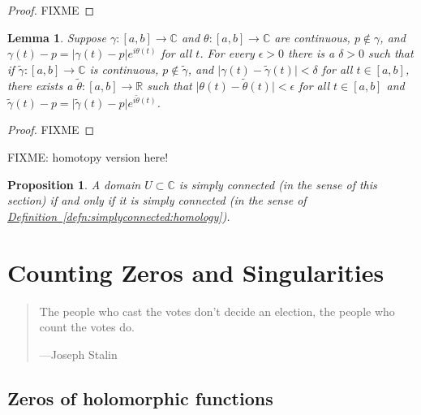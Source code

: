 \documentclass[12pt,openany]{book}
\newcommand{\sabs}[1]{\lvert {#1} \rvert}
\newcommand{\C}{{\mathbb{C}}}
\newcommand{\R}{{\mathbb{R}}}
\theoremstyle{plain}
\newtheorem{lemma}[thm]{Lemma}
\newtheorem{prop}[thm]{Proposition}
\theoremstyle{remark}
\theoremstyle{definition}
\newenvironment{myquote}{%
    \begin{quote}%
    \begingroup\itshape
}{%
    \endgroup%
    \end{quote}
}
\theoremstyle{exercise}
\theoremstyle{example}
\newcommand{\defnref}[1]{\hyperref[#1]{Definition~\ref*{#1}}}
\begin{document}
\begin{proof}
FIXME
\end{proof}

\begin{lemma}
Suppose $\gamma \colon [a,b] \to \C$ and $\theta \colon [a,b] \to \C$
are continuous, $p \notin \gamma$,
and $\gamma(t)-p = \sabs{\gamma(t)-p} e^{i\theta(t)}$ for all $t$.
For every $\epsilon > 0$ there is a $\delta > 0$ such that
if $\widetilde{\gamma} \colon [a,b] \to \C$ is continuous,
$p \notin \widetilde{\gamma}$, and
$\sabs{\gamma(t)-\widetilde{\gamma}(t)} < \delta$ for all $t \in [a,b]$,
there exists a $\widetilde{\theta} \colon [a,b] \to \R$ such that
$\sabs{\theta(t)-\widetilde{\theta}(t)} < \epsilon$ for all $t \in [a,b]$
and $\widetilde{\gamma}(t)-p = \sabs{\widetilde{\gamma}(t)-p}
e^{i\widetilde{\theta}(t)}$.
\end{lemma}

\begin{proof}
FIXME
\end{proof}

FIXME: homotopy version here!

\begin{prop}
A domain $U \subset \C$ is simply connected (in the sense of this section)
if and only if it is simply connected
(in the sense of \defnref{defn:simplyconnected:homology}).
\end{prop}


\chapter{Counting Zeros and Singularities} \label{ch:counting}

\begin{myquote}
The people who cast the votes don't decide an election, the people who count
the votes do.

---Joseph Stalin
\end{myquote}


\section{Zeros of holomorphic functions}
\end{document}
